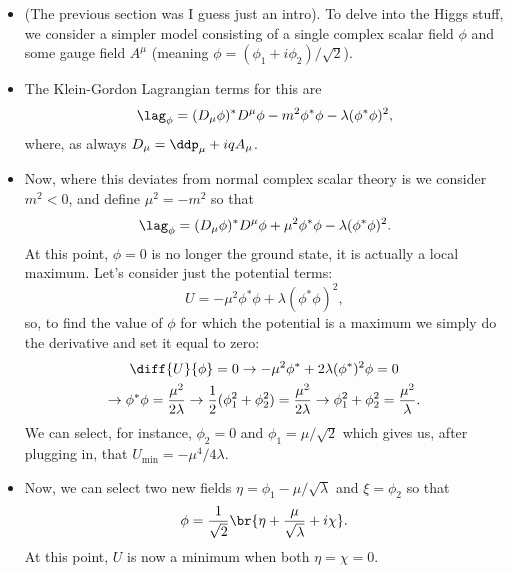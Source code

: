 \begin{itemize}
\item (The previous section was I guess just an intro). To delve into the Higgs stuff, we consider a simpler model consisting of a single complex scalar field $\phi$ and some gauge field $A^\mu$ (meaning $\phi = (\phi_1 + i\phi_2)/\sqrt{2}$).
\item The Klein-Gordon Lagrangian terms for this are
  \begin{equation}
    \lag_\phi = (D_\mu\phi)^*D^\mu\phi - m^2\phi^*\phi - \lambda(\phi^*\phi)^2,
  \end{equation}
  where, as always $D_\mu = \ddp_\mu + iqA_\mu$.
\item Now, where this deviates from normal complex scalar theory is we consider $m^2 < 0$, and define $\mu^2 = -m^2$ so that
  \begin{equation}
    \lag_\phi = (D_\mu\phi)^*D^\mu\phi + \mu^2\phi^*\phi - \lambda(\phi^*\phi)^2.
  \end{equation}
  At this point, $\phi=0$ is no longer the ground state, it is actually a local maximum. Let's consider just the potential terms:
  \begin{equation}
    U = -\mu^2\phi^*\phi + \lambda(\phi^*\phi)^2,
  \end{equation}
  so, to find the value of $\phi$ for which the potential is a maximum we simply do the derivative and set it equal to zero:
  \begin{gather}
    \diff{U}{\phi} = 0 \rightarrow -\mu^2\phi^* + 2\lambda(\phi^*)^2\phi = 0 \\
    \rightarrow \phi^*\phi = \frac{\mu^2}{2\lambda} \rightarrow \frac{1}{2}(\phi_1^2 + \phi_2^2) = \frac{\mu^2}{2\lambda} \rightarrow \phi_1^2 + \phi_2^2 = \frac{\mu^2}{\lambda}.
  \end{gather}
  We can select, for instance, $\phi_2=0$ and $\phi_1 = \mu/\sqrt{2}$ which gives us, after plugging in, that $U_{\mathrm{min}} = -\mu^4/4\lambda$.
\item Now, we can select two new fields $\eta = \phi_1 - \mu/\sqrt{\lambda}$ and $\xi = \phi_2$ so that
  \begin{equation}
    \phi = \frac{1}{\sqrt{2}}\br{\eta + \frac{\mu}{\sqrt{\lambda}} + i\chi}.
  \end{equation}
  At this point, $U$ is now a minimum when both $\eta = \chi = 0$.


\end{itemize}
